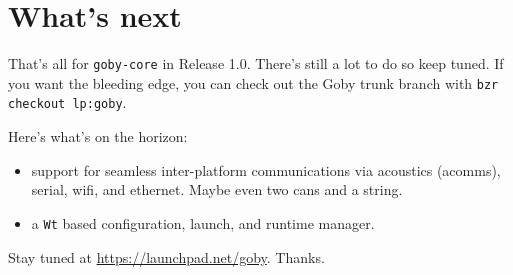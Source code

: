 \chapter{What's next}

That's all for \verb|goby-core| in Release 1.0. There's still a lot to do so keep tuned. If you want the bleeding edge, you can check out the Goby trunk branch with 
\verb|bzr checkout lp:goby|.

Here's what's on the horizon:
\begin{itemize}
\item support for seamless inter-platform communications via acoustics (acomms), serial, wifi, and ethernet. Maybe even two cans and a string.
\item a \verb|Wt| \cite{wt} based configuration, launch, and runtime manager.
\end{itemize}

Stay tuned at \url{https://launchpad.net/goby}. Thanks.

